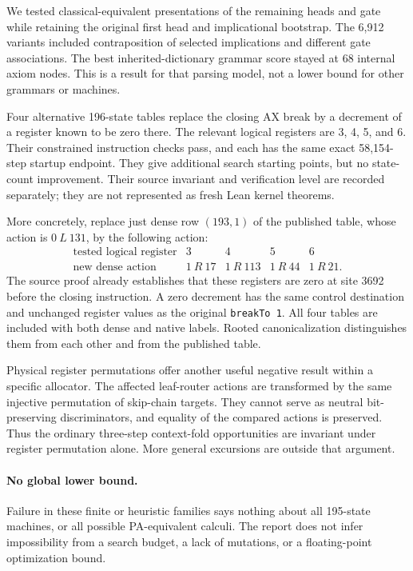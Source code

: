 \documentclass[11pt,letterpaper]{article}
\newcommand{\file}[1]{\texttt{\nolinkurl{#1}}}
\begin{document}
We tested classical-equivalent presentations of the remaining heads and
gate while retaining the original first head and implicational bootstrap.
The 6,912 variants included contraposition of selected implications and
different gate associations. The best inherited-dictionary grammar
score stayed at 68 internal axiom nodes. This is a result for that
parsing model, not a lower bound for other grammars or machines.

Four alternative 196-state tables replace the closing AX break by a
decrement of a register known to be zero there. The relevant logical
registers are 3, 4, 5, and 6. Their constrained instruction checks pass,
and each has the same exact 58,154-step startup endpoint. They give
additional search starting points, but no state-count improvement.
Their source invariant and verification level are recorded separately;
they are not represented as fresh Lean kernel theorems.

More concretely, replace just dense row $(193,1)$ of the published
table, whose action is $0\ L\ 131$, by the following action:
\[
\begin{array}{c|rrrr}
\text{tested logical register}&3&4&5&6\\\hline
\text{new dense action}&1\ R\ 17&1\ R\ 113&1\ R\ 44&1\ R\ 21.
\end{array}
\]
The source proof already establishes that these registers are zero at
site 3692 before the closing instruction. A zero decrement has the same
control destination and unchanged register values as the original
\file{breakTo 1}. All four tables are included with both dense and native
labels. Rooted canonicalization distinguishes them from each other and
from the published table.

Physical register permutations offer another useful negative result
within a specific allocator. The affected leaf-router actions are
transformed by the same injective permutation of skip-chain targets.
They cannot serve as neutral bit-preserving discriminators, and equality
of the compared actions is preserved. Thus the ordinary three-step
context-fold opportunities are invariant under register permutation
alone. More general excursions are outside that argument.

\paragraph{No global lower bound.}
Failure in these finite or heuristic families says nothing about all
195-state machines, or all possible PA-equivalent calculi. The report
does not infer impossibility from a search budget, a lack of mutations,
or a floating-point optimization bound.
\end{document}
